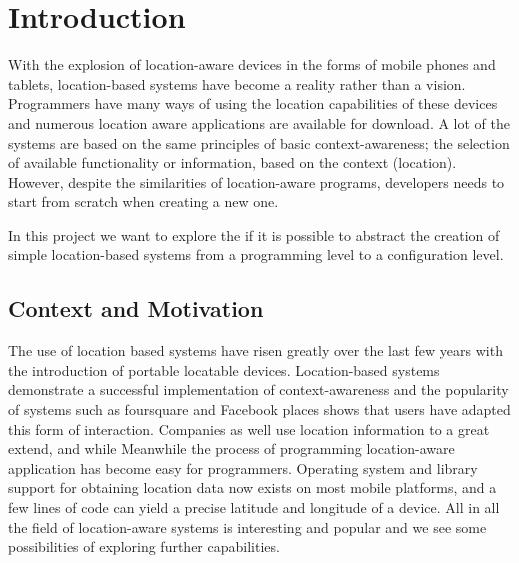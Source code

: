 
\section{Introduction}
\label{sec.introduction}

With the explosion of location-aware devices in the forms of mobile phones and tablets, location-based systems have become a reality rather than a vision. Programmers have many ways of using the location capabilities of these devices and numerous location aware applications are available for download. A lot of the systems are based on the same principles of basic context-awareness; the selection of available functionality or information, based on the context (location). However, despite the similarities of location-aware programs, developers needs to start from scratch when creating a new one. 

In this project we want to explore the if it is possible to abstract the creation of simple location-based systems from a programming level to a configuration level.


\subsection{Context and Motivation} %
\label{sub:context_and_motivation}
The use of location based systems have risen greatly over the last few years with the introduction of portable locatable devices. Location-based systems demonstrate a successful implementation of context-awareness and the popularity of systems such as foursquare and Facebook places shows that users have adapted this form of interaction. Companies as well use location information to a great extend, and while  Meanwhile the process of programming location-aware application has become easy for programmers. Operating system and library support for obtaining location data now exists on most mobile platforms, and a few lines of code can yield a precise latitude and longitude of a device. All in all the field of location-aware systems is interesting and popular and we see some possibilities of exploring further capabilities.

